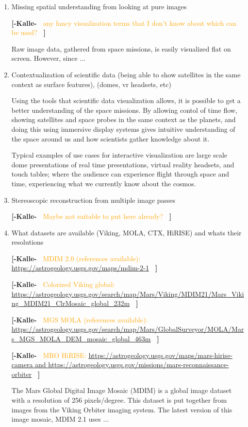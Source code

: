 \documentclass[journal]{vgtc}                %
\newcommand{\kallecomment}[1]{\textbf{[-Kalle-~}
    \textcolor{orange}{#1}
    \textbf{~]}}
\begin{document}
\begin{enumerate}
\item Missing spatial understanding from looking at pure images

\kallecomment{any fancy visualization terms that I don't know about which can be used?}

Raw image data, gathered from space missions, is easily visualized flat on screen. However, since ... 

\item Contextualization of scientific data (being able to show satellites in the same context as surface features), (domes, vr headsets, etc)

Using the tools that scientific data visualization allows, it is possible to get a better understanding of the space missions. By allowing contol of time flow, showing satellites and space probes in the same context as the planets, and doing this using immersive display systems gives intuitive understanding of the space around us and how scientists gather knowledge about it.

Typical examples of use cases for interactive visualization are large scale dome presentations of real time presentations, virtual reality headsets, and touch tables; where the audience can experience flight through space and time, experiencing what we currently know about the cosmos.

\item Stereoscopic reconstruction from multiple image passes

\kallecomment{Maybe not suitable to put here already?}

\item What datasets are available (Viking, MOLA, CTX, HiRISE) and whats their resolutions

\kallecomment{MDIM 2.0 (references available): \url{https://astrogeology.usgs.gov/maps/mdim-2-1}}

\kallecomment{Colorized Viking global: \url{https://astrogeology.usgs.gov/search/map/Mars/Viking/MDIM21/Mars_Viking_MDIM21_ClrMosaic_global_232m}}

\kallecomment{MGS MOLA (references available): \url{https://astrogeology.usgs.gov/search/map/Mars/GlobalSurveyor/MOLA/Mars_MGS_MOLA_DEM_mosaic_global_463m}}

\kallecomment{MRO HiRISE: \url{https://astrogeology.usgs.gov/maps/mars-hirise-camera and https://astrogeology.usgs.gov/missions/mars-reconnaissance-orbiter}}

The Mars Global Digital Image Mosaic (MDIM) is a global image dataset with a resolution of 256 pixels/degree. This dataset is put together from images from the Viking Orbiter imaging system. The latest version of this image mosaic, MDIM 2.1 uses ...


\end{enumerate}
\end{document}

